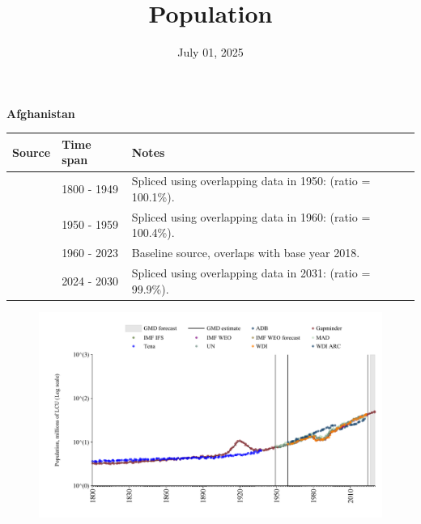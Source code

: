 \documentclass[12pt,a4paper,landscape]{article}
\begin{document}
\title{\Large Population}
\date{July 01, 2025}
\maketitle
\thispagestyle{empty}

\clearpage
\setcounter{page}{1}
\hypersetup{colorlinks=true,linkcolor=blue,linktoc=all}
\label{toc}
\tableofcontents
\thispagestyle{empty}
\setcounter{page}{3}
\begin{adjustbox}{max totalsize={\paperwidth}{\paperheight},center}
\begin{minipage}[t][\textheight][t]{\textwidth}
\vspace*{0.5cm}
{}
\begin{center}
{\Large\bfseries Afghanistan}
\end{center}
\vspace{0.5cm}
\begin{table}[H]
\centering
\small
\begin{tabular}{|l|l|l|}
\hline
\textbf{Source} & \textbf{Time span} & \textbf{Notes} \\
\hline
\rowcolor{white}\cite{Gapminder}& 1800 - 1949 &Spliced using overlapping data in 1950: (ratio = 100.1\%).\\
\rowcolor{lightgray}\cite{IMF_IFS}& 1950 - 1959 &Spliced using overlapping data in 1960: (ratio = 100.4\%).\\
\rowcolor{white}\cite{WDI}& 1960 - 2023 &Baseline source, overlaps with base year 2018.\\
\rowcolor{lightgray}\cite{Gapminder}& 2024 - 2030 &Spliced using overlapping data in 2031: (ratio = 99.9\%).\\
\hline
\end{tabular}
\end{table}
\begin{figure}[H]
\centering
\includegraphics[width=\textwidth,height=0.6\textheight,keepaspectratio]{graphs/AFG_pop.pdf}
\end{figure}
\end{minipage}
\end{adjustbox}
\end{document}
